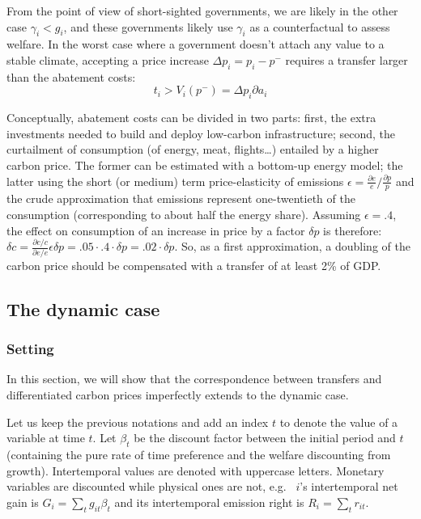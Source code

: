 \documentclass[
  letterpaper,
  DIV=11,
  numbers=noendperiod]{scrartcl}
\begin{document}
From the point of view of short-sighted governments, we are likely in
the other case \(\gamma_i < g_i\), and these governments likely use
\(\gamma_i\) as a counterfactual to assess welfare. In the worst case
where a government doesn't attach any value to a stable climate,
accepting a price increase \(\Delta p_i = p_i - p^-\) requires a
transfer larger than the abatement costs:
\[t_i > V_i(p^-) = \Delta p_i \partial a_i\]

Conceptually, abatement costs can be divided in two parts: first, the
extra investments needed to build and deploy low-carbon infrastructure;
second, the curtailment of consumption (of energy, meat, flights\ldots)
entailed by a higher carbon price. The former can be estimated with a
bottom-up energy model; the latter using the short (or medium) term
price-elasticity of emissions
\(\epsilon = \frac{\partial e}{e}/\frac{\partial p}{p}\) and the crude
approximation that emissions represent one-twentieth of the consumption
(corresponding to about half the energy share). Assuming
\(\epsilon = .4\), the effect on consumption of an increase in price by
a factor \(\delta p\) is therefore:
\(\delta c = \frac{\partial c/c}{\partial e/e} \epsilon \delta p = .05 \cdot .4 \cdot \delta p = .02 \cdot \delta p\).
So, as a first approximation, a doubling of the carbon price should be
compensated with a transfer of at least 2\% of GDP.

\subsection{The dynamic case}\label{the-dynamic-case}

\subsubsection{Setting}\label{setting-1}

In this section, we will show that the correspondence between transfers
and differentiated carbon prices imperfectly extends to the dynamic
case.

Let us keep the previous notations and add an index \(t\) to denote the
value of a variable at time \(t\). Let \(\beta_t\) be the discount
factor between the initial period and \(t\) (containing the pure rate of
time preference and the welfare discounting from growth). Intertemporal
values are denoted with uppercase letters. Monetary variables are
discounted while physical ones are not, e.g.~ \(i\)'s intertemporal net
gain is \(G_i = \sum_t g_{it} \beta_t\) and its intertemporal emission
right is \(R_i = \sum_t r_{it}\).
\end{document}
